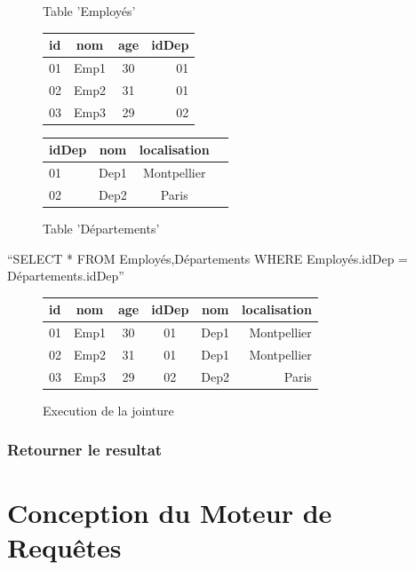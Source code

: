 \documentclass[oneside,13pt,a4paper]{report}
\begin{document}
\begin{figure}[h]
	\begin{minipage}[c]{.46\linewidth}
		\centering
		\caption{Table 'Employés'}
		\begin{tabular}{|l|c|c|r|}
			\hline
			id   & nom  & age & idDep 
			\\
			\hline
			01 & Emp1 &  30  & 01 \\
			02 & Emp2 &  31  & 01 \\
			03 & Emp3 &  29  & 02 \\
			\hline
		\end{tabular}
	\end{minipage}
	\hfill%
	\begin{minipage}[c]{.46\linewidth}
		\centering
		\caption{Table 'Départements'}
		\begin{tabular}{|l|c|c|r|}
			\hline
			idDep   & nom   & localisation
			\\
			\hline
			01 & Dep1 &  Montpellier  \\
			02 & Dep2 &  Paris  \\
			\hline
		\end{tabular}
	\end{minipage}
\end{figure}

	\enquote{SELECT * FROM Employés,Départements WHERE Employés.idDep = Départements.idDep}

\begin{figure}[h]
		\centering
		\caption{Execution de la jointure}
		\begin{tabular}{|l|c|c|c|c|r|}
			\hline
			id   & nom  & age & idDep & nom   & localisation 
			\\
			\hline
			01 & Emp1 &  30  & 01 & Dep1 &  Montpellier \\
			02 & Emp2 &  31  & 01 & Dep1 &  Montpellier \\
			03 & Emp3 &  29  & 02 & Dep2 &  Paris \\
			\hline
		\end{tabular}
\end{figure}


\subsection{Retourner le resultat}



\chapter{Conception du Moteur de Requêtes}
\end{document}
